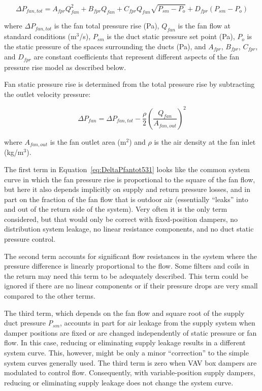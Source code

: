 \begin{equation}
\Delta {P_{fan,tot}} = {A_{fpr}}Q_{fan}^2 + {B_{fpr}}Q_{fan}^{} + {C_{fpr}}Q_{fan}^{}\sqrt {{P_{sm}} - {P_o}} + {D_{fpr}}\left( {{P_{sm}} - {P_o}} \right)
\label{eq:DeltaPfantot531}
\end{equation}

where \(\Delta P_{fan,tot}\) is the fan total pressure rise (Pa), \(Q_{fan}\) is the fan flow at standard conditions (m\(^{3}\)/s), \(P_{sm}\) is the duct static pressure set point (Pa), \(P_{o}\) is the static pressure of the spaces surrounding the ducts (Pa), and \(A_{fpr}\), \(B_{fpr}\), \(C_{fpr}\), and \(D_{fpr}\) are constant coefficients that represent different aspects of the fan pressure rise model as described below.

Fan static pressure rise is determined from the total pressure rise by subtracting the outlet velocity pressure:

\begin{equation}
\Delta {P_{fan}} = \Delta {P_{fan,tot}} - \frac{\rho }{2}{\left( {\frac{{{Q_{fan}}}}{{{A_{fan,out}}}}} \right)^2}
\end{equation}

where \(A_{fan,out}\) is the fan outlet area (m\(^{2}\)) and \(\rho\) is the air density at the fan inlet (kg/m\(^{3}\)).

The first term in Equation~\ref{eq:DeltaPfantot531} looks like the common system curve in which the fan pressure rise is proportional to the square of the fan flow, but here it also depends implicitly on supply and return pressure losses, and in part on the fraction of the fan flow that is outdoor air (essentially ``leaks'' into and out of the return side of the system). Very often it is the only term considered, but that would only be correct with fixed-position dampers, no distribution system leakage, no linear resistance components, and no duct static pressure control.

The second term accounts for significant flow resistances in the system where the pressure difference is linearly proportional to the flow. Some filters and coils in the return may need this term to be adequately described. This term could be ignored if there are no linear components or if their pressure drops are very small compared to the other terms.

The third term, which depends on the fan flow and square root of the supply duct pressure \emph{P\(_{sm}\)}, accounts in part for air leakage from the supply system when damper positions are fixed or are changed independently of static pressure or fan flow. In this case, reducing or eliminating supply leakage results in a different system curve. This, however, might be only a minor ``correction'' to the simple system curves generally used. The third term is zero when VAV box dampers are modulated to control flow. Consequently, with variable-position supply dampers, reducing or eliminating supply leakage does not change the system curve.

